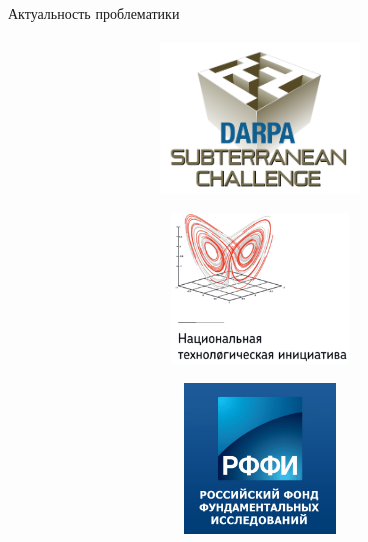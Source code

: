 \documentclass[aspectratio=169,xcolor=table]{beamer}
\begin{document}
\begin{frame}[t]{Актуальность проблематики}
\framesubtitle{}
\begin{figure}[H]
    \begin{subfigure}[t]{0.32\textwidth}
        \centering\includegraphics[height=4cm,width=1\textwidth,keepaspectratio]{Darpa_SubT.png}
        \label{fig:Darpa_SubT.png}
    \end{subfigure}
    \begin{subfigure}[t]{0.32\textwidth}
        \centering\includegraphics[height=4cm,width=1\textwidth,keepaspectratio]{NTI.png}
        \label{fig:NTI.png}
    \end{subfigure}
    \begin{subfigure}[t]{0.32\textwidth}
        \centering\includegraphics[height=4cm,width=1\textwidth,keepaspectratio]{rffi.jpeg}
        \label{fig:rffi.jpeg}
    \end{subfigure}
\end{figure}
\end{frame}
\end{document}
